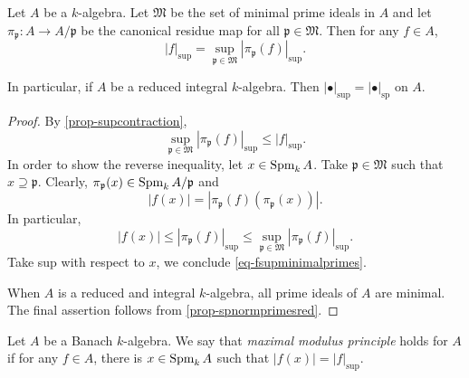 \begin{proposition}\label{prop-supeqsp}
    Let $A$ be a $k$-algebra. Let $\mathfrak{M}$ be the set of minimal prime ideals in $A$ and let $\pi_{\mathfrak{p}}:A\rightarrow A/\mathfrak{p}$ be the canonical residue map for all $\mathfrak{p}\in \mathfrak{M}$. Then for any $f\in A$,
    \begin{equation}\label{eq-fsupminimalprimes}
        |f|_{\sup}=\sup_{\mathfrak{p}\in \mathfrak{M}} |\pi_{\mathfrak{p}}(f)|_{\sup}.
    \end{equation}

    In particular, if $A$ be a reduced integral $k$-algebra. Then $|\bullet|_{\sup}=|\bullet|_{\mathrm{sp}}$ on $A$.
\end{proposition}
\begin{proof}
    By \cref{prop-supcontraction}, 
    \[
        \sup_{\mathfrak{p}\in \mathfrak{M}} |\pi_{\mathfrak{p}}(f)|_{\sup}\leq |f|_{\sup}.  
    \]
    In order to show the reverse inequality, let $x\in \operatorname{Spm}_k A$. Take $\mathfrak{p}\in \mathfrak{M}$ such that $x\supseteq \mathfrak{p}$. Clearly, $\pi_{\mathfrak{p}}(x)\in \operatorname{Spm}_k A/\mathfrak{p}$ and
    \[
        |f(x)|=\left|\pi_{\mathfrak{p}}(f)(\pi_{\mathfrak{p}}(x))\right|.  
    \]
    In particular,
    \[
        |f(x)|\leq |\pi_{\mathfrak{p}}(f)|_{\sup}\leq \sup_{\mathfrak{p}\in \mathfrak{M}}   |\pi_{\mathfrak{p}}(f)|_{\sup}.
    \]
    Take sup with respect to $x$, we conclude \eqref{eq-fsupminimalprimes}.

    When $A$ is a reduced and integral $k$-algebra, all prime ideals of $A$ are minimal. The final assertion follows from \cref{prop-spnormprimesred}.
\end{proof}


\begin{definition}
    Let $A$ be a Banach $k$-algebra. We say that \emph{maximal modulus principle} holds for $A$ if for any $f\in A$, there is $x\in \operatorname{Spm}_k A$ such that $|f(x)|=|f|_{\sup}$.
\end{definition}

